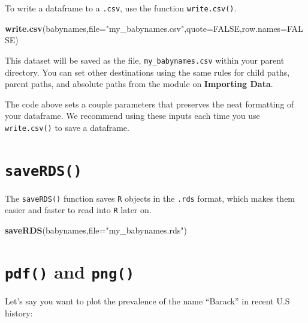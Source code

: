 \documentclass[
]{book}
\newenvironment{Shaded}{\begin{snugshade}}{\end{snugshade}}
\newcommand{\DataTypeTok}[1]{\textcolor[rgb]{0.13,0.29,0.53}{#1}}
\newcommand{\KeywordTok}[1]{\textcolor[rgb]{0.13,0.29,0.53}{\textbf{#1}}}
\newcommand{\NormalTok}[1]{#1}
\newcommand{\OtherTok}[1]{\textcolor[rgb]{0.56,0.35,0.01}{#1}}
\newcommand{\StringTok}[1]{\textcolor[rgb]{0.31,0.60,0.02}{#1}}
\begin{document}
To write a dataframe to a \texttt{.csv}, use the function \texttt{write.csv()}.

\begin{Shaded}
\begin{Highlighting}[]
\KeywordTok{write.csv}\NormalTok{(babynames,}\DataTypeTok{file=}\StringTok{"my_babynames.csv"}\NormalTok{,}\DataTypeTok{quote=}\OtherTok{FALSE}\NormalTok{,}\DataTypeTok{row.names=}\OtherTok{FALSE}\NormalTok{)}
\end{Highlighting}
\end{Shaded}

This dataset will be saved as the file, \texttt{my\_babynames.csv} within your parent directory. You can set other destinations using the same rules for child paths, parent paths, and absolute paths from the module on \textbf{Importing Data}.

The code above sets a couple parameters that preserves the neat formatting of your dataframe. We recommend using these inputs each time you use \texttt{write.csv()} to save a dataframe.

\hypertarget{saverds}{%
\section*{\texorpdfstring{\texttt{saveRDS()}}{saveRDS()}}\label{saverds}}

The \texttt{saveRDS()} function saves \texttt{R} objects in the \texttt{.rds} format, which makes them easier and faster to read into \texttt{R} later on.

\begin{Shaded}
\begin{Highlighting}[]
\KeywordTok{saveRDS}\NormalTok{(babynames,}\DataTypeTok{file=}\StringTok{"my_babynames.rds"}\NormalTok{)}
\end{Highlighting}
\end{Shaded}

\hypertarget{pdf-and-png}{%
\section*{\texorpdfstring{\texttt{pdf()} and \texttt{png()}}{pdf() and png()}}\label{pdf-and-png}}

Let's say you want to plot the prevalence of the name ``Barack'' in recent U.S history:
\end{document}
